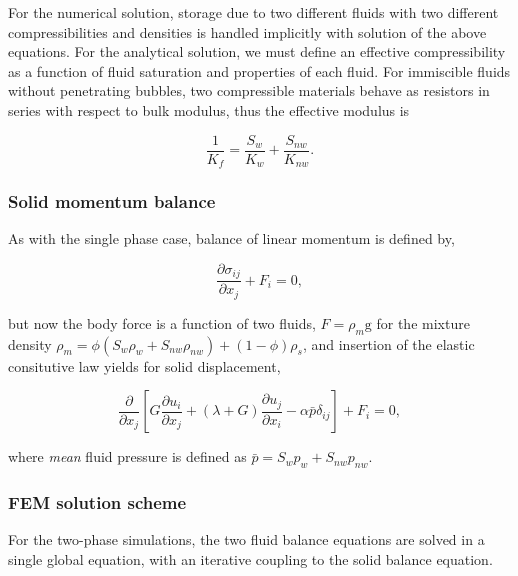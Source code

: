 For the numerical solution, storage due to two different fluids with two different compressibilities and densities is handled implicitly with solution of the above equations. For the analytical solution, we must define an effective compressibility as a function of fluid saturation and properties of each fluid. For immiscible fluids without penetrating bubbles, two compressible materials behave as resistors in series with respect to bulk modulus, thus the effective modulus is

\begin{equation}
\frac{1}{{{K}_{f}}}=\frac{{{S}_{w}}}{{{K}_{w}}}+\frac{{{S}_{nw}}}{{{K}_{nw}}}.
\end{equation}

\subsubsection*{Solid momentum balance}

As with the single phase case, balance of linear momentum is defined by,

\begin{equation}
\frac{\partial {{\sigma }_{ij}}}{\partial {{x}_{j}}}+{{F}_{i}}=0,
\end{equation}

but now the body force is a function of two fluids, $F=\rho _m \text{g}$ for the mixture density $\rho _m =\phi (S_w \rho _w + S_{nw} \rho _{nw}) + (1-\phi )\rho _s$, and insertion of the elastic consitutive law yields for solid displacement,

\begin{equation}
\frac{\partial }{\partial {{x}_{j}}}\left[ G\frac{\partial {{u}_{i}}}{\partial {{x}_{j}}}+\left( \lambda +G \right)\frac{\partial {{u}_{j}}}{\partial {{x}_{i}}}-\alpha \bar{p}{{\delta }_{ij}} \right]+{{F}_{i}}=0,
\end{equation}

where \textit{mean} fluid pressure is defined as $\bar{p}=S_wp_w + S_{nw}p_{nw}$.

\subsubsection*{FEM solution scheme}
For the two-phase simulations, the two fluid balance equations are solved in a single global equation, with an iterative coupling to the solid balance equation. 





